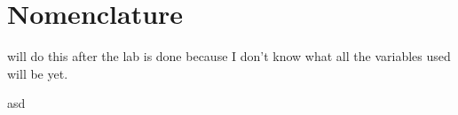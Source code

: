 \section{Nomenclature}  
will do this after the lab is done because I don't know what all the variables used will be yet.

asd